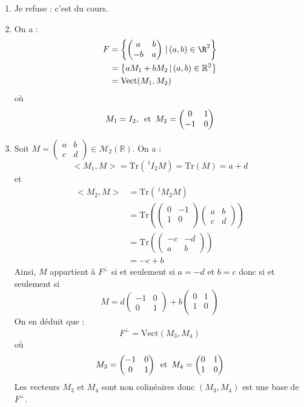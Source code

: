 \documentclass[a4paper,10pt]{report}
\begin{document}
\begin{enumerate}
\item Je refuse : c'est du cours.
\item On a :
\begin{align*}
F & =\left \lbrace \begin{pmatrix} a & b\\ -b & a \end{pmatrix} \, \vert \,  (a,b)\in\R^2\right\rbrace \\
& = \left\lbrace aM_1+bM_2 \, \vert \, (a,b) \in \mathbb{R}^2 \right\rbrace \\
& = \textrm{Vect}(M_1,M_2)
\end{align*}
où
$$ M_1 = I_2, \, \hbox{ et } \, M_2 = \begin{pmatrix}
0 & 1 \\
-1 & 0 \\
\end{pmatrix}$$
\item Soit $M = \begin{pmatrix}
a & b \\
c & d 
\end{pmatrix} \in \mathcal{M}_2(\mathbb{R})$. On a :
$$<M_1,M> = \textrm{Tr}(~^tI_2 M) = \textrm{Tr}(M) = a+d$$
et 
\begin{align*}
<M_2,M> & = \textrm{Tr}(~^t M_2M) \\
& = \textrm{Tr} \left( \begin{pmatrix}
0 & -1 \\
1 & 0 \\
\end{pmatrix}  \begin{pmatrix}
a & b \\
c & d 
\end{pmatrix}  \right)   \\
& =  \textrm{Tr} \left( \begin{pmatrix}
-c & -d \\
a & b
\end{pmatrix} \right) \\
& = -c+b
\end{align*}
Ainsi, $M$ appartient à $F^{\perp}$ si et seulement si $a=-d$ et $b=c$ donc si et seulement si 
$$ M = d \begin{pmatrix}
-1 & 0 \\
0 & 1 
\end{pmatrix} + b \begin{pmatrix}
0 & 1 \\
1 & 0 \\
\end{pmatrix}$$
On en déduit que :
$$ F^{\perp} = \textrm{Vect}(M_3,M_4)$$
où
$$ M_3 = \begin{pmatrix}
-1 & 0 \\
0 & 1 
\end{pmatrix} \, \hbox{ et } \, M_4 = \begin{pmatrix}
0 & 1 \\
1 & 0 
\end{pmatrix}$$
Les vecteurs $M_3$ et $M_4$ sont non colinéaires donc $(M_3,M_4)$ est une base de $F^{\perp}$.


\end{enumerate}
\end{document}
